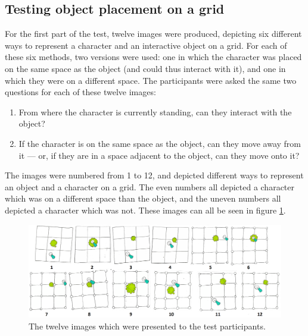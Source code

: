 \subsection{Testing object placement on a grid}
For the first part of the test, twelve images were produced, depicting six different ways to represent a character and an interactive object on a grid. For each of these six methods, two versions were used: one in which the character was placed on the same space as the object (and could thus interact with it), and one in which they were on a different space. The participants were asked the same two questions for each of these twelve images:

\begin{enumerate}
    \item From where the character is currently standing, can they interact with the object?
    \item If the character is on the same space as the object, can they move away from it --- or, if they are in a space adjacent to the object, can they move onto it?
\end{enumerate}

The images were numbered from 1 to 12, and depicted different ways to represent an object and a character on a grid. The even numbers all depicted a character which was on a different space than the object, and the uneven numbers all depicted a character which was not. These images can all be seen in figure \ref{fig:papergrid}.

\begin{figure}[h!]
	\centering
	\includegraphics[width=\textwidth]{figures/paper_0.png}
	\caption{The twelve images which were presented to the test participants. \label{fig:papergrid}}
\end{figure}

